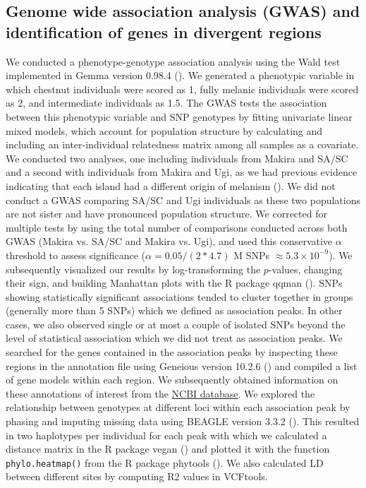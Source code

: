 \subsection{Genome wide association analysis (\acs{GWAS}) and identification of genes in divergent regions}
We conducted a phenotype-genotype association analysis using the Wald test implemented in Gemma version 0.98.4 (\cite{zhou2014efficient}). We generated a phenotypic variable in which chestnut individuals were scored as 1, fully melanic individuals were scored as 2, and intermediate individuals as 1.5. The \acs{GWAS} tests the association between this phenotypic variable and \acs{SNP} genotypes by fitting univariate linear mixed models, which account for population structure by calculating and including an inter-individual relatedness matrix among all samples as a covariate. We conducted two analyses, one including individuals from Makira and \ac{SA/SC} and a second with individuals from Makira and Ugi, as we had previous evidence indicating that each island had a different origin of melanism (\cite{uy2016mutations}). We did not conduct a \acs{GWAS} comparing \ac{SA/SC} and Ugi individuals as these two populations are not sister and have pronounced population structure. We corrected for multiple tests by using the total number of comparisons conducted across both \acs{GWAS} (Makira vs. \ac{SA/SC} and Makira vs. Ugi), and used this conservative $\alpha$ threshold to assess significance ($\alpha = 0.05/(2*4.7)$ M \acsp{SNP} $\approx 5.3\times 10^{-9}$). We subsequently visualized our results by log-transforming the $p$-values, changing their sign, and building Manhattan plots with the R package qqman (\cite{Turner2018qqman}). \acsp{SNP} showing statistically significant associations tended to cluster together in groups (generally more than 5 \acsp{SNP}) which we defined as association peaks. In other cases, we also observed single or at most a couple of isolated \acsp{SNP} beyond the level of statistical association which we did not treat as association peaks. We searched for the genes contained in the association peaks by inspecting these regions in the annotation file using Geneious version 10.2.6 (\cite{kearse2012geneious}) and compiled a list of gene models within each region. We subsequently obtained information on these annotations of interest from the \href{http://www.ncbi.nlm.nih.gov/}{NCBI database}. We explored the relationship between genotypes at different loci within each association peak by phasing and imputing missing data using BEAGLE version 3.3.2 (\cite{browning2007rapid}). This resulted in two haplotypes per individual for each peak with which we calculated a distance matrix in the R package vegan (\cite{oksanen2022vegan}) and plotted it with the function \texttt{phylo.heatmap()} from the R package phytools (\cite{revell2012phytools}). We also calculated \ac{LD} between different sites by computing R2 values in VCFtools.


